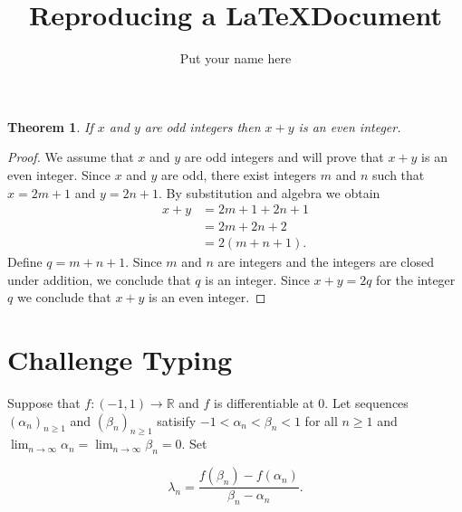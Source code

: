 \documentclass{article}  %
\title{Reproducing a \LaTeX Document}
\author{Put your name here}
\date{}
\newtheorem*{thm}{Theorem}
\newcommand{\R}{\mathbb{R}}
\begin{document}
\maketitle

\begin{thm}
If $x$ and $y$ are odd integers then $x+y$ is an even integer.
\end{thm}

\begin{proof}
We assume that $x$ and $y$ are odd integers and will prove that $x+y$ is an even integer. Since $x$ and $y$ are odd, there exist integers $m$ and $n$ such that $x=2m+1$ and $y=2n+1$.  By substitution and algebra we obtain
\begin{align*}
x+y &= 2m+1 + 2n + 1\\
&= 2m+2n+2\\
&=2(m+n+1).
\end{align*}
Define $q=m+n+1$.  Since $m$ and $n$ are integers and the integers are closed under addition, we conclude that $q$ is an integer. Since $x+y=2q$ for the integer $q$ we conclude that $x+y$ is an even integer.
\end{proof}


\vspace{.15in}

\section*{Challenge Typing}


Suppose that $f:(-1,1)\to \R$ and $f$ is differentiable at $0$. Let sequences $(\alpha_n)_{n\geq1}$ and $(\beta_n)_{n\geq1}$ satisify $-1<\alpha_n<\beta_n<1$ for all $n\geq 1$ and $\displaystyle{\lim_{n\to\infty}} \alpha_n = \displaystyle{\lim_{n\to\infty}} \beta_n = 0$. Set 
	
		$$\lambda_n = \frac{f(\beta_n) -f(\alpha_n)}{\beta_n-\alpha_n} . $$
\end{document}
